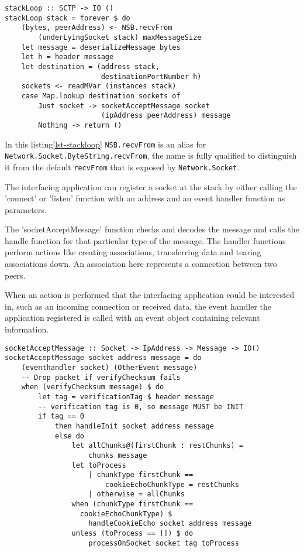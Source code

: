 \begin{lstlisting}[caption={The stack loop},label={lst-stackloop}]
stackLoop :: SCTP -> IO ()
stackLoop stack = forever $ do
    (bytes, peerAddress) <- NSB.recvFrom 
        (underLyingSocket stack) maxMessageSize
    let message = deserializeMessage bytes
    let h = header message
    let destination = (address stack,
                       destinationPortNumber h)
    sockets <- readMVar (instances stack)
    case Map.lookup destination sockets of
        Just socket -> socketAcceptMessage socket
                       (ipAddress peerAddress) message
        Nothing -> return ()
\end{lstlisting}

In this listing\ref{lst-stackloop} \lstinline{NSB.recvFrom} is an alias for \lstinline{Network.Socket.ByteString.recvFrom}, the name is fully qualified to distinguish it from the default \lstinline{recvFrom} that is exposed by \lstinline{Network.Socket}.

The interfacing application can register a socket at the stack by either calling the 'connect' or 'listen' function with an address and an event handler function as parameters.

The 'socketAcceptMessage' function checks and decodes the message and calls the handle function for that particular type of the message. The handler functions perform actions like creating associations, transferring data and tearing associations down. An association here represents a connection between two peers.

When an action is performed that the interfacing application could be interested in, such as an incoming connection or received data, the event handler the application registered is called with an event object containing relevant information.

\begin{lstlisting}[caption={socketAcceptMessage decides what to do with a message}]
socketAcceptMessage :: Socket -> IpAddress -> Message -> IO()
socketAcceptMessage socket address message = do
    (eventhandler socket) (OtherEvent message)
    -- Drop packet if verifyChecksum fails
    when (verifyChecksum message) $ do
        let tag = verificationTag $ header message
        -- verification tag is 0, so message MUST be INIT
        if tag == 0 
            then handleInit socket address message
            else do
                let allChunks@(firstChunk : restChunks) =
                    chunks message
                let toProcess
                    | chunkType firstChunk ==
                        cookieEchoChunkType = restChunks
                    | otherwise = allChunks
                when (chunkType firstChunk == 
                  cookieEchoChunkType) $
                    handleCookieEcho socket address message
                unless (toProcess == []) $ do
                    processOnSocket socket tag toProcess
\end{lstlisting}

